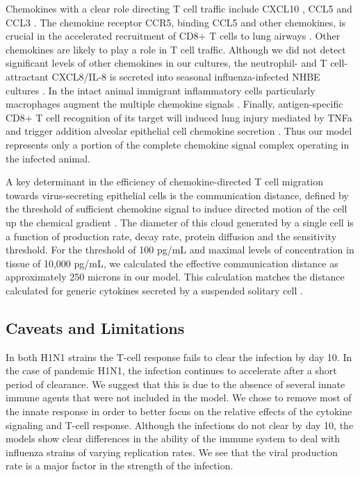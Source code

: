 \documentclass[10pt]{article}
\begin{document}
Chemokines with a clear role directing T cell traffic include CXCL10 \cite{Dufour2002}, CCL5 \cite{Kawai1999} and CCL3 \cite{Kawai1999}.  The chemokine receptor CCR5, binding CCL5 and other chemokines, is crucial in the accelerated recruitment of CD8+ T cells to lung airways \cite{Kohlmeier2008}.  Other chemokines are likely to play a role in T cell traffic.  Although we did not detect significant levels of other chemokines in our cultures, the neutrophil- and T cell-attractant CXCL8/IL-8 is secreted into seasonal influenza-infected NHBE cultures \cite{Matsukura1996, Arndt2002}.  In the intact animal immigrant inflammatory cells particularly macrophages augment the multiple chemokine signals \cite{Julkunen2000}.  Finally, antigen-specific CD8+ T cell recognition of its target will induced lung injury mediated by TNFa and trigger addition alveolar epithelial cell chemokine secretion \cite{Zhao2000}.   Thus our model represents only a portion of the complete chemokine signal complex operating in the infected animal.

A key determinant in the efficiency of chemokine-directed T cell migration towards virus-secreting epithelial cells is the communication distance, defined by the threshold of sufficient chemokine signal to induce directed motion of the cell up the chemical gradient \cite{Thelen2008}.  The diameter of this cloud generated by a single cell is a function of production rate, decay rate, protein diffusion and the sensitivity threshold.  For the threshold of 100 pg/mL and maximal levels of concentration in tissue of 10,000 pg/mL, we calculated the effective communication distance as approximately 250 microns in our model.  This calculation matches the distance calculated for generic cytokines secreted by a suspended solitary cell \cite{Francis1997}.


\subsection*{Caveats and Limitations}

In both H1N1 strains the T-cell response fails to clear the infection by day 10.  In the case of pandemic H1N1, the infection continues to accelerate after a short period of clearance.  We suggest that this is due to the absence of several innate immune agents that were not included in the model.  We chose to remove most of the innate response in order to better focus on the relative effects of the cytokine signaling and T-cell response.  Although the infections do not clear by day 10, the models show clear differences in the ability of the immune system to deal with influenza strains of varying replication rates.  We see that the viral production rate is a major factor in the strength of the infection.
\end{document}
